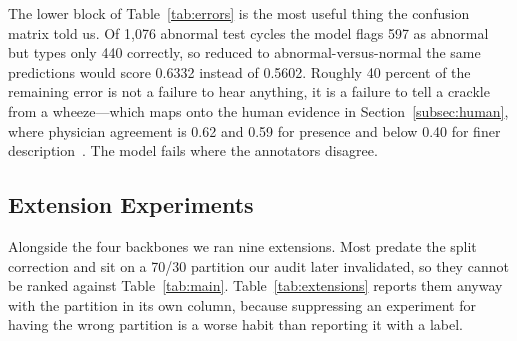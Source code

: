 \documentclass[journal,onecolumn]{IEEEtran}
\begin{document}
The lower block of Table~\ref{tab:errors} is the most useful thing the confusion matrix told
us. Of 1,076 abnormal test cycles the model flags 597 as abnormal but types only 440
correctly, so reduced to abnormal-versus-normal the same predictions would score 0.6332
instead of 0.5602. Roughly 40 percent of the remaining error is not a failure to hear
anything, it is a failure to tell a crackle from a wheeze---which maps onto the human
evidence in Section~\ref{subsec:human}, where physician agreement is 0.62 and 0.59 for
presence and below 0.40 for finer description~\cite{melbye2016kappa,huang2024crackles}. The
model fails where the annotators disagree.

\subsection{Extension Experiments}
\label{subsec:extensions}

Alongside the four backbones we ran nine extensions. Most predate the split correction and sit
on a 70/30 partition our audit later invalidated, so they cannot be ranked against
Table~\ref{tab:main}. Table~\ref{tab:extensions} reports them anyway with the partition in its
own column, because suppressing an experiment for having the wrong partition is a worse habit
than reporting it with a label.
\end{document}
